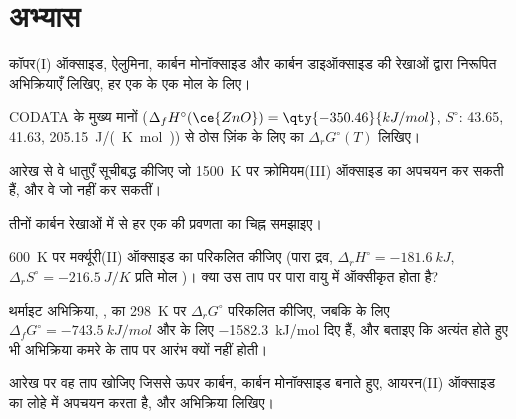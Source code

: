\section{अभ्यास}

\begin{exercise}[$\star$]\label{exo:b2:ellingham:1}
कॉपर(I) ऑक्साइड, ऐलुमिना, कार्बन मोनॉक्साइड और कार्बन डाइऑक्साइड की रेखाओं द्वारा
निरूपित अभिक्रियाएँ लिखिए, हर एक  के एक मोल के लिए।
\end{exercise}

\begin{exercise}[$\star$]\label{exo:b2:ellingham:2}
CODATA के मुख्य मानों ($\Delta_f H^\circ(\ce{ZnO}) = \qty{-350.46}{kJ/mol}$,
$S^\circ$:  43.65,  41.63,  \qty{205.15}{J/(K.mol)}) से
ठोस ज़िंक के लिए  का $\Delta_r G^\circ(T)$ लिखिए।
\end{exercise}

\begin{exercise}[$\star$]\label{exo:b2:ellingham:3}
आरेख से वे धातुएँ सूचीबद्ध कीजिए जो \qty{1500}{K} पर क्रोमियम(III) ऑक्साइड का
अपचयन कर सकती हैं, और वे जो नहीं कर सकतीं।
\end{exercise}

\begin{exercise}[$\star$]\label{exo:b2:ellingham:4}
तीनों कार्बन रेखाओं में से हर एक की प्रवणता का चिह्न समझाइए।
\end{exercise}

\begin{exercise}[$\star\star$]\label{exo:b2:ellingham:5}
\qty{600}{K} पर मर्क्यूरी(II) ऑक्साइड का  परिकलित कीजिए
(पारा द्रव, $\Delta_r H^\circ = \qty{-181.6}{kJ}$, $\Delta_r S^\circ =
\qty{-216.5}{J/K}$ प्रति मोल )। क्या उस ताप पर पारा वायु में
ऑक्सीकृत होता है?
\end{exercise}

\begin{exercise}[$\star\star$]\label{exo:b2:ellingham:6}
थर्माइट अभिक्रिया, , का \qty{298}{K} पर $\Delta_r G^\circ$ परिकलित कीजिए, जबकि
 के लिए $\Delta_f G^\circ = \qty{-743.5}{kJ/mol}$ और  के लिए \qty{-1582.3}{kJ/mol}
दिए हैं, और बताइए कि अत्यंत  होते हुए भी अभिक्रिया
कमरे के ताप पर आरंभ क्यों नहीं होती।
\end{exercise}

\begin{exercise}[$\star\star$]\label{exo:b2:ellingham:7}
आरेख पर वह ताप खोजिए जिससे ऊपर कार्बन, कार्बन मोनॉक्साइड बनाते हुए,
आयरन(II) ऑक्साइड का लोहे में अपचयन करता है, और अभिक्रिया लिखिए।
\end{exercise}

